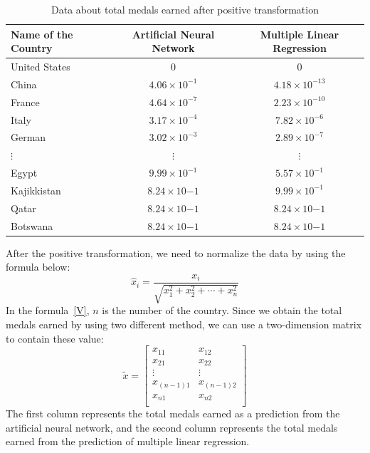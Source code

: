 \documentclass{mcmthesis}
\begin{document}
\begin{table}[H]
\centering 
\label{A}
\caption{Data about total medals earned after positive transformation}
\vspace{5pt}
\begin{tabular}{lcc}
\hline
\textbf{Name of the Country} & \textbf{Artificial Neural Network} & \textbf{Multiple Linear Regression} \\
\hline\hline
United States & 0 & 0\\
China & $4.06\times 10^{-1}$  & $4.18\times 10^{-13}$\\
France & $4.64\times 10^{-7}$ & $2.23\times 10^{-10}$\\
Italy & $3.17\times 10^{-4}$ & $7.82\times 10^{-6}$\\
German & $3.02\times 10^{-3}$ & $2.89\times 10^{-7}$\\
$\vdots$ & $\vdots$ & $\vdots$ \\ 
Egypt & $9.99\times 10^{-1}$ & $5.57\times 10^{-1}$\\
Kajikkistan & $8.24\times 10{-1}$ & $9.99\times 10^{-1}$\\
Qatar & $8.24\times 10{-1}$ & $8.24\times 10{-1}$\\
Botswana & $8.24\times 10{-1}$ & $8.24\times 10{-1}$\\
\hline
\end{tabular}
\end{table}
After the positive transformation, we need to normalize the data by using the formula below:\\
\begin{equation}\label{V}
\hat{x}_i=\frac{x_i}{\sqrt{x_{1}^{2}+x_{2}^{2}+\cdots+x_{n}^{2}}}
\end{equation}
In the formula~\eqref{V}, $n$ is the number of the country. Since we obtain the total medals earned by using two different method, we can use a two-dimension matrix to contain these value:\\
\begin{equation}\label{eq:3}
\tilde{x}=
\begin{bmatrix}
	x_{11}&		x_{12}\\
	x_{21}&		x_{22}\\
	\vdots&		\vdots\\
	x_{(n-1)1}&		x_{(n-1)2}\\
	x_{n1}&		x_{n2}\\
\end{bmatrix}
\end{equation}
The first column represents the total medals earned as a prediction from the artificial neural network, and the second column represents the total medals earned from the prediction of multiple linear regression.
\end{document}
